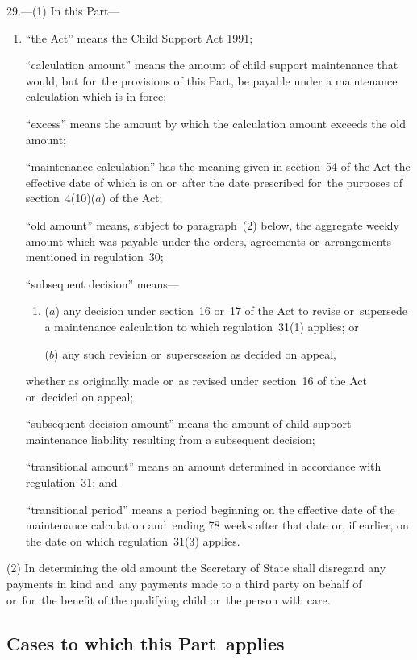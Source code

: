 \documentclass[12pt,a4paper]{article}
\begin{document}
29.---(1)  In this Part—
\begin{enumerate}\item[]
“the Act” means the Child Support Act 1991;

“calculation amount” means the amount of child support maintenance that would, but for~the provisions of this Part, be payable under a maintenance calculation which is in force;

“excess” means the amount by which the calculation amount exceeds the old amount;

“maintenance calculation” has the meaning given in section~54 of the Act the effective date of which is on or~after the date prescribed for~the purposes of section~4(10)($a$)  of the Act;

“old amount” means, subject to paragraph~(2) below, the aggregate weekly amount which was payable under the orders, agreements or~arrangements mentioned in regulation~30;

“subsequent decision” means—
\begin{enumerate}\item[]
($a$) 
any decision under section~16 or~17 of the Act to revise or~supersede a maintenance calculation to which regulation~31(1) applies; or

($b$) 
any such revision or~supersession as decided on appeal,
\end{enumerate}
whether as originally made or~as revised under section~16 of the Act or~decided on appeal;

“subsequent decision amount” means the amount of child support maintenance liability resulting from a subsequent decision;

“transitional amount” means an amount determined in accordance with regulation~31; and

“transitional period” means a period beginning on the effective date of the maintenance calculation and~ending 78 weeks after that date or, if earlier, on the date on which regulation~31(3) applies.
\end{enumerate}

(2) In determining the old amount the Secretary of State shall disregard any payments in kind and~any payments made to a third party on behalf of or~for~the benefit of the qualifying child or~the person with care.

\subsection[30. Cases to which this Part~applies]{Cases to which this Part~applies}
\end{document}
